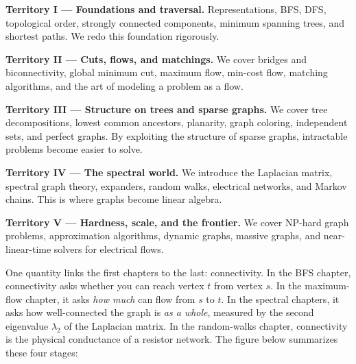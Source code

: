 \begin{focusbox}
\textbf{Territory I --- Foundations and traversal.} Representations, BFS, DFS, topological order, strongly connected components, minimum spanning trees, and shortest paths. We redo this foundation rigorously.

\textbf{Territory II --- Cuts, flows, and matchings.} We cover bridges and biconnectivity, global minimum cut, maximum flow, min-cost flow, matching algorithms, and the art of modeling a problem as a flow.

\textbf{Territory III --- Structure on trees and sparse graphs.} We cover tree decompositions, lowest common ancestors, planarity, graph coloring, independent sets, and perfect graphs. By exploiting the structure of sparse graphs, intractable problems become easier to solve.

\textbf{Territory IV --- The spectral world.} We introduce the Laplacian matrix, spectral graph theory, expanders, random walks, electrical networks, and Markov chains. This is where graphs become linear algebra.

\textbf{Territory V --- Hardness, scale, and the frontier.} We cover NP-hard graph problems, approximation algorithms, dynamic graphs, massive graphs, and near-linear-time solvers for electrical flows.
\end{focusbox}

One quantity links the first chapters to the last: connectivity. In the BFS chapter, connectivity asks whether you can reach vertex $t$ from vertex $s$. In the maximum-flow chapter, it asks \emph{how much} can flow from $s$ to $t$. In the spectral chapters, it asks how well-connected the graph is \emph{as a whole}, measured by the second eigenvalue $\lambda_2$ of the Laplacian matrix. In the random-walks chapter, connectivity is the physical conductance of a resistor network. The figure below summarizes these four stages:

